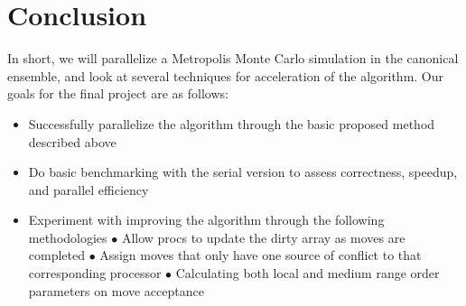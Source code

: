 \documentclass{article}
\begin{document}
\section*{Conclusion}
\vspace{-7pt}
In short, we will parallelize a Metropolis Monte Carlo simulation in the canonical ensemble, and look at several techniques for acceleration of the algorithm. Our goals for the final project are as follows:
\begin{itemize}
\item Successfully parallelize the algorithm through the basic proposed method described above
\item Do basic benchmarking with the serial version to assess correctness, speedup, and parallel efficiency
\item Experiment with improving the algorithm through the following methodologies
\subitem $\bullet$ Allow procs to update the dirty array as moves are completed
\subitem $\bullet$ Assign moves that only have one source of conflict to that corresponding processor
\subitem $\bullet$ Calculating both local and medium range order parameters on move acceptance
\end{itemize}
\end{document}
